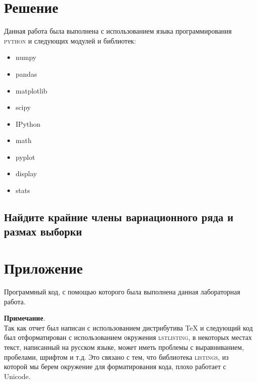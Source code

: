 \documentclass[a4paper, 14pt]{extarticle}
\begin{document}
\newpage

\section{Решение}
Данная работа была выполнена с использованием языка программирования 
\textsc{python} и следующих модулей и библиотек: 

\renewcommand{\labelitemi}{\scalebox{0.6}{$\bullet$}}

\begin{center}
    \begin{multicols}{4}
        \begin{itemize}
            \item numpy
            \item pandas
            \item matplotlib
            \item scipy
            \item IPython
            \item math
            \item pyplot
            \item display
            \item stats
        \end{itemize}
    \end{multicols}
\end{center}

\subsection{Найдите крайние члены вариационного ряда и размах выборки}


\section{Приложение}

Программный код, с помощью которого была выполнена данная лабораторная работа.\\

\vspace{20pt}

\noindent \textbf{Примечание}.\\

\noindent Так как отчет был написан с использованием дистрибутива TeX и 
следующий код был отформатирован с использованием окружения \textsc{lstlisting}, 
в некоторых местах текст, написанный на русском языке, может иметь проблемы 
с выравниванием, пробелами, шрифтом и т.д. Это связано с тем, что библиотека 
\textsc{listings}, из которой мы берем окружение для форматирования кода, 
плохо работает с Unicode.
\end{document}

